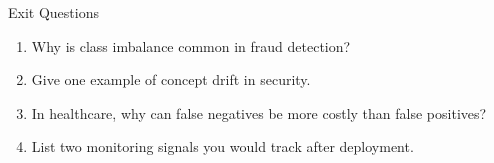 \documentclass[aspectratio=169]{beamer}
\begin{document}
\begin{frame}{Exit Questions}
  \begin{enumerate}
    \item Why is class imbalance common in fraud detection?
    \item Give one example of concept drift in security.
    \item In healthcare, why can false negatives be more costly than false positives?
    \item List two monitoring signals you would track after deployment.
  \end{enumerate}
\end{frame}
\end{document}
